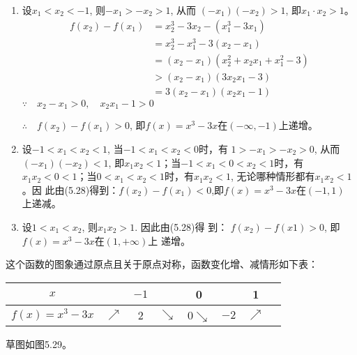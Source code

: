 \begin{solution}
\begin{enumerate}
    \item 
设$x_1<x_2<-1$, 则$-x_1>-x_2>1$, 从而
$(-x_1)(-x_2)>1$,  即$x_1\cdot x_2>1$。
\begin{equation}
    \begin{split}
    f(x_2)-f(x_1)&=x_2^3-3x_2-(x_1^3-3x_1)\\
    &= x_2^3-x_1^3-3(x_2-x_1)\\
&=(x_2-x_1)(x_2^2+x_2x_1+x_1^2-3)\\
&>(x_2-x_1)(3x_2x_1-3)\\
&=3(x_2-x_1)(x_2x_1-1)
\end{split}
\end{equation}
$\because\quad x_2-x_1>0,\quad x_2x_1-1>0$

$\therefore\quad f(x_2)-f(x_1)>0$, 即$f(x)=x^3-3x$在$(-\infty,-1)$上递增。

\item 设$-1<x_1<x_2<1$, 当$-1<x_1<x_2<0$时，有
$1>-x_1>-x_2>0$,  从而$(-x_1)(-x_2)<1$, 即$x_1x_2<
1$；当$-1<x_1<0<x_2<1$时，有$x_1x_2<0<1$；$当0<x_1
<x_2<1$时，有$x_1x_2<1$, 无论哪种情形都有$x_1x_2<1$。因
此由(5.28)得到：$f(x_2)-f(x_1)<0$,即$f(x)=x^3-3x$在$(-1,1)$
上递减。

\item 设$1<x_1<x_2$, 则$x_1x_2>1$. 因此由(5.28)得
到：
$f(x_2)-f(x1)>0$, 即$f(x)=x^3-3x$在$(1,+\infty)$上
递增。
\end{enumerate}

这个函数的图象通过原点且关于原点对称，函数变化增、减情形如下表：
\begin{center}
\begin{tabular}{c|ccccccc}
    \hline
    $x$    &&$-1$&& 0 && 1           \\
    \hline
    $f(x)=x^3-3x$& $\nearrow $&2&$\searrow $&0$\searrow $&$-2$&$\nearrow$\\
    \hline
\end{tabular}
\end{center}
    
\end{solution}
    
草图如图5.29。
\begin{figure}[htp]
    \centering
{}    
    \caption{}
\end{figure}

